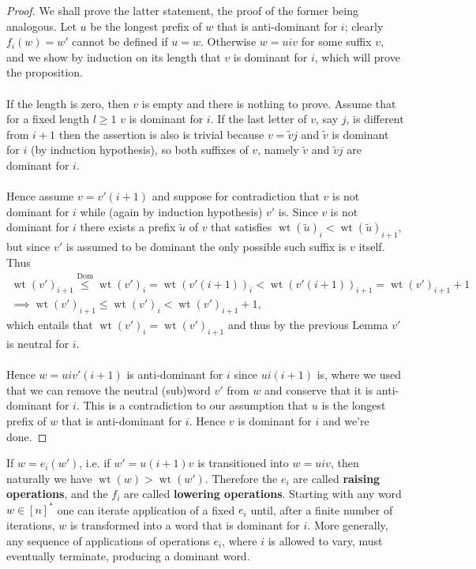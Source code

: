 \documentclass{article}
\DeclareMathOperator{\wt}{wt}
\begin{document}
\begin{proof}
We shall prove the latter statement,  the proof of the former being analogous. Let $u$ be the longest prefix of $w$ that is anti-dominant for $i$; clearly $f_i(w)=w'$ cannot be defined if $u=w$. Otherwise $w=uiv$ for some suffix $v$, and we show by induction on its length that $v$ is dominant for $i$, which will prove the proposition. \\
\\
If the length is zero, then $v$ is empty and there is nothing to prove. Assume that for a fixed length $l \geq 1$ $v$ is dominant for $i$. If the last letter of $v$, say $j$, is different from $i+1$ then the assertion is also is trivial because $v=\widetilde{v}j$ and $\widetilde{v}$ is dominant for $i$ (by induction hypothesis), so both suffixes of $v$, namely $\widetilde{v}$ and $\widetilde{v}j$ are dominant for $i$.\\
\\
Hence assume $v=v'(i+1)$ and suppose for contradiction that $v$ is not dominant for $i$ while (again by induction hypothesis) $v'$ is. Since $v$ is not dominant for $i$ there exists a prefix $\widetilde{u}$ of $v$ that satisfies $\wt(\widetilde{u})_i < \wt(\widetilde{u})_{i+1}$, but since $v'$ is assumed to be dominant the only possible such suffix is $v$ itself. Thus 
\begin{align*}
  \wt(v')_{i+1} \overset{\text{Dom}}\leq  \wt(v')_i = \wt(v'(i+1))_i < \wt(v'(i+1))_{i+1} = \wt(v')_{i+1}+1 \\
  \implies \wt(v')_{i+1} \leq \wt(v')_i < \wt(v')_{i+1}+1,
\end{align*} which entails that $\wt(v')_i = \wt(v')_{i+1}$ and thus by the previous Lemma $v'$ is neutral for $i$.
\\\\
Hence $w=uiv'(i+1)$ is anti-dominant for $i$ since $ui(i+1)$ is, where we used that we can remove the neutral (sub)word $v'$ from $w$ and conserve that it is anti-dominant for $i$. This is a contradiction to our assumption that $u$ is the longest prefix of $w$ that is anti-dominant for $i$. Hence $v$ is dominant for $i$ and we're done. 
\end{proof}
If $w= e_i(w')$, i.e. if $w'=u(i+1)v$ is transitioned into $w=uiv$, then naturally we have $\wt(w) > \wt(w')$. Therefore the $e_i$ are called \textbf{raising operations}, and the $f_i$ are called \textbf{lowering operations}. Starting with any word $w \in [n]^*$ one can iterate application of a fixed $e_i$ until, after a finite number of iterations, $w$ is transformed into a word that is dominant for $i$. More generally, any sequence of applications of operations $e_i$, where $i$ is allowed to vary, must eventually terminate, producing a dominant word. 
\newpage
\end{document}
